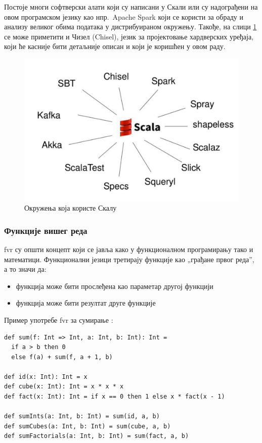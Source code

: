 \documentclass[12pt, a4paper]{article}
\theoremstyle{definition}
\begin{document}
Постоје многи софтверски алати који су написани у Скали или су надограђени на овом програмском језику као нпр.\ Apache Spark који се користи за обраду и анализу великог обима података у дистрибуираном окружењу. Такође, на слици \ref{fig:scalaDer} се може приметити и Чизел (Chisel), језик за пројектовање хардверских уређаја, који ће касније бити детаљније описан и који је коришћен у овом раду.
\begin{figure}[H]
  \centering
      \includegraphics[scale=0.27]{slike/scalaDer}
  \caption{Окружења која користе Скалу}
  \label{fig:scalaDer}
\end{figure}

\subsubsection{Функције вишег реда}
\ac{fvr} су општи концепт који се јавља како у функционалном програмирању тако и математици. Функционални језици третирају функције као „грађане првог реда”, а то значи да:
\begin{itemize}
 \item функција може бити прослеђена као параметар другој функцији
 \item функција може бити резултат друге функције
\end{itemize}

Пример употребе \acs{fvr} за сумирање \cite{courseraHOF}:
\begin{verbatim}
def sum(f: Int => Int, a: Int, b: Int): Int =
  if a > b then 0
  else f(a) + sum(f, a + 1, b)

def id(x: Int): Int = x
def cube(x: Int): Int = x * x * x
def fact(x: Int): Int = if x == 0 then 1 else x * fact(x - 1)

def sumInts(a: Int, b: Int) = sum(id, a, b)
def sumCubes(a: Int, b: Int) = sum(cube, a, b)
def sumFactorials(a: Int, b: Int) = sum(fact, a, b)
\end{verbatim}
\end{document}

